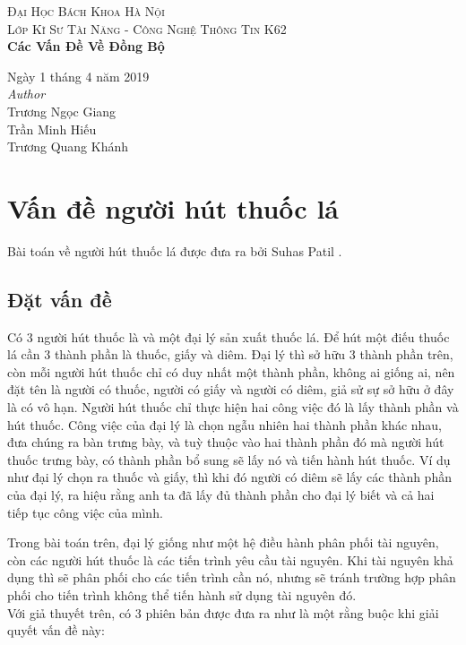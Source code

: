 \documentclass[a4paper]{article}
\begin{document}
\textsc{\LARGE Đại Học Bách Khoa Hà Nội} \\[1,5cm]
	\textsc{\large Lớp Kĩ Sư Tài Năng - Công Nghệ Thông Tin K62} \\[0.5cm]
	{\huge\bfseries Các Vấn Đề Về Đồng Bộ}\\[0.4cm] 
	
		\begin{flushleft}
			\large
			Ngày 1 tháng 4 năm 2019 \\[0.5cm]
			\textit{Author}\\[0,3cm]
			   Trương Ngọc Giang \\
			   Trần Minh Hiếu  \\
			   Trương Quang Khánh \\
		\end{flushleft}
	\tableofcontents
	\newpage
	
	\section{Vấn đề người hút thuốc lá}
	Bài toán về người hút thuốc lá được đưa ra bởi Suhas Patil \cite{littlebook4}.
	\subsection{Đặt vấn đề}
	
	
	\begin{tcolorbox}
		Có 3 người hút thuốc là và một đại lý sản xuất thuốc lá. Để hút một điếu thuốc lá cần 3 thành 
		phần là thuốc, giấy và diêm. Đại lý thì sở hữu 3 thành phần trên, còn mỗi người hút thuốc
		chỉ có duy nhất một thành phần, không ai giống ai, nên đặt tên là người có thuốc, người có giấy
		và người có diêm, giả sử sự sở hữu ở đây là có vô hạn. Người hút thuốc chỉ thực hiện hai công
		việc đó là lấy thành phần và hút thuốc. Công việc của đại lý là chọn ngẫu nhiên hai thành phần 
		khác nhau, đưa chúng ra bàn trưng bày, và tuỳ thuộc vào hai thành phần đó mà người hút thuốc trưng bày,
		có thành phần bổ sung sẽ lấy nó
		và tiến hành hút thuốc. Ví dụ như đại lý chọn ra thuốc và giấy, thì khi đó người có diêm sẽ lấy 
		các thành phần của đại lý, ra hiệu rằng anh ta đã lấy đủ thành phần cho đại lý biết và cả hai tiếp
		tục công việc của mình.
	\end{tcolorbox}

	Trong bài toán trên, đại lý giống như một hệ điều hành phân phối tài nguyên, còn các người hút thuốc
	là các tiến trình yêu cầu tài nguyên. Khi tài nguyên khả dụng thì sẽ phân phối cho các tiến trình cần
	nó, nhưng sẽ tránh trường hợp phân phối cho tiến trình không thể tiến hành sử dụng tài nguyên đó. \\
	Với giả thuyết trên, có 3 phiên bản được đưa ra như là một rằng buộc khi giải quyết vấn đề này:
\end{document}
